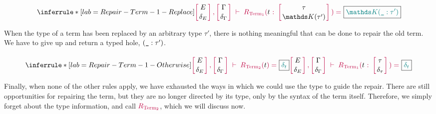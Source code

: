 \paragraph{}

$$\RepairTermOneReplace{}$$

When the type of a term has been replaced by an arbitrary type $\tau'$, there is
nothing meaningful that can be done to repair the old term.  We have to give up
and return a typed hole, $(\texttt{\_}{} : \tau')$.

\paragraph{}

$$\RepairTermOneOtherwise{}$$

Finally, when none of the other rules apply, we have exhausted the ways in which
we could use the type to guide the repair.  There are still opportunities for
repairing the term, but they are no longer directed by its type, only by the
syntax of the term itself.  Therefore, we simply forget about the type
information, and call $\textcolor{purple}{R_{\text{Term}_2}}{}$, which we will discuss now.
